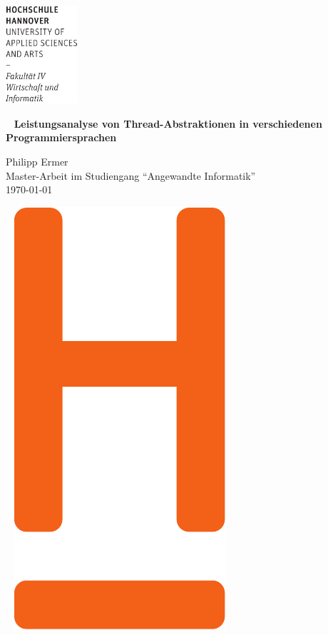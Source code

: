 \documentclass[fontsize=12pt,paper=a4,twoside=semi,parskip=half-,headsepline,headinclude]{scrreprt}
\begin{document}
	
	\renewcommand{\figurename}{Abb.}
	
  \thispagestyle{empty} %
\includegraphics[width=0.2\textwidth]{hsh_icons/Wortmarke_WI_schwarz}

   {  ~ \sffamily
  \vfill
  {\Huge\bfseries Leistungsanalyse von Thread-Abstraktionen in verschiedenen Programmiersprachen}
  \bigskip

  {\Large 
  Philipp Ermer \\[2ex]
 Master-Arbeit im Studiengang "`Angewandte Informatik"' 
 \\[5ex]
   \today } 
}
 \vfill
  
  ~ \hfill
  \includegraphics[height=0.3\paperheight]{hsh_icons/H_WI_Pantone1665} 
\end{document}
